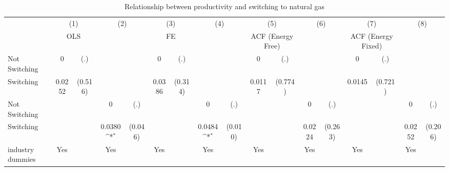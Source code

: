 \begin{table}[htbp]\centering
\def\sym#1{\ifmmode^{#1}\else\(^{#1}\)\fi}
\caption{Relationship between productivity and switching to natural gas}
\begin{tabular}{l*{8}{cc}}
\toprule
                    &\multicolumn{2}{c}{(1)}           &\multicolumn{2}{c}{(2)}           &\multicolumn{2}{c}{(3)}           &\multicolumn{2}{c}{(4)}           &\multicolumn{2}{c}{(5)}           &\multicolumn{2}{c}{(6)}           &\multicolumn{2}{c}{(7)}           &\multicolumn{2}{c}{(8)}           \\
                    &\multicolumn{2}{c}{OLS}           &\multicolumn{2}{c}{}              &\multicolumn{2}{c}{FE}            &\multicolumn{2}{c}{}              &\multicolumn{2}{c}{ACF (Energy Free)}&\multicolumn{2}{c}{}              &\multicolumn{2}{c}{ACF (Energy Fixed)}&\multicolumn{2}{c}{}              \\
\midrule
Not Switching       &           0         &         (.)&                     &            &           0         &         (.)&                     &            &           0         &         (.)&                     &            &           0         &         (.)&                     &            \\
Switching           &      0.0252         &     (0.516)&                     &            &      0.0386         &     (0.314)&                     &            &      0.0117         &     (0.774)&                     &            &      0.0145         &     (0.721)&                     &            \\
Not Switching       &                     &            &           0         &         (.)&                     &            &           0         &         (.)&                     &            &           0         &         (.)&                     &            &           0         &         (.)\\
Switching           &                     &            &      0.0380\sym{*}  &     (0.046)&                     &            &      0.0484\sym{*}  &     (0.010)&                     &            &      0.0224         &     (0.263)&                     &            &      0.0252         &     (0.206)\\
industry dummies    &         Yes         &            &         Yes         &            &         Yes         &            &         Yes         &            &         Yes         &            &         Yes         &            &         Yes         &            &         Yes         &            \\

\end{tabular}
\end{table}
